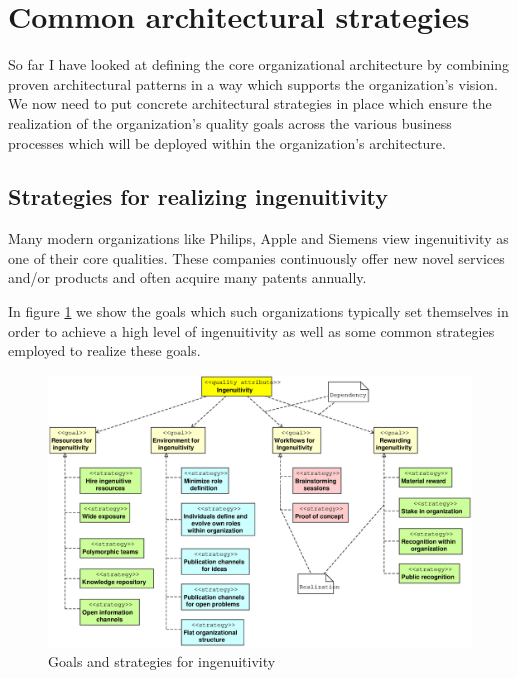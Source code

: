 \documentclass[11pt,english,a4]{article}
\begin{document}
\section{Common architectural strategies}

So far I have looked at defining the core organizational architecture by combining proven architectural patterns in a way which supports the organization's vision. We now need to put concrete architectural strategies in place which ensure the realization of the organization's quality goals across the various business processes which will be deployed within the organization's architecture.

\subsection{Strategies for realizing ingenuitivity}

Many modern organizations like Philips, Apple and Siemens view ingenuitivity as one of their core qualities. These companies continuously offer new novel services and/or products and often acquire many patents annually.

In figure \ref{ingenuitivityTactics_fig} we show the goals which such organizations typically set themselves in order to achieve a high level of ingenuitivity as well as some common strategies employed to realize these goals.

\begin{figure}[hbt]
  \begin{center}
    \includegraphics[scale=0.4]{ingenuitivityTactics}
    \caption{Goals and strategies for ingenuitivity}\label{ingenuitivityTactics_fig}
  \end{center}
\end{figure}
\end{document}
